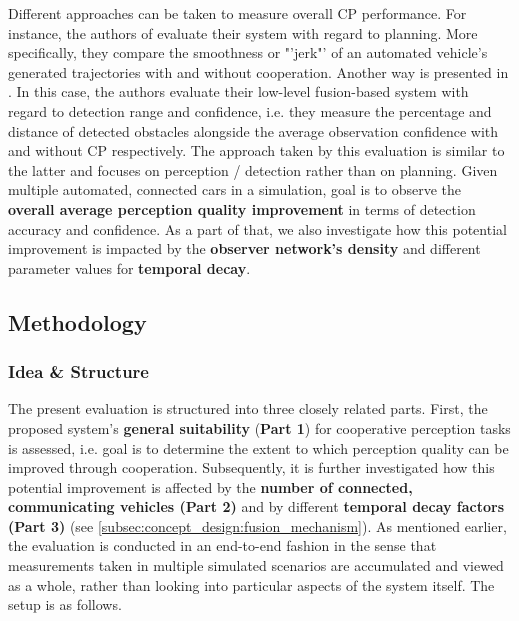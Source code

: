Different approaches can be taken to measure overall CP performance. For instance, the authors of \cite{liu2013motion} evaluate their system with regard to planning. More specifically, they compare the smoothness or "'jerk"' of an automated vehicle's generated trajectories with and without cooperation. Another way is presented in \cite{Chen2019}. In this case, the authors evaluate their low-level fusion-based system with regard to detection range and confidence, i.e. they measure the percentage and distance of detected obstacles alongside the average observation confidence with and without CP respectively. The approach taken by this evaluation is similar to the latter and focuses on perception / detection rather than on planning. Given multiple automated, connected cars in a simulation, goal is to observe the \textbf{overall average perception quality improvement} in terms of detection accuracy and confidence. As a part of that, we also investigate how this potential improvement is impacted by the \textbf{observer network's density} and different parameter values for \textbf{temporal decay}.

\subsection{Methodology}
\label{subsec:evaluation:perception_evaluation:methodology}

\subsubsection{Idea \& Structure}
The present evaluation is structured into three closely related parts. First, the proposed system's \textbf{general suitability} (\textbf{Part 1}) for cooperative perception tasks is assessed, i.e. goal is to determine the extent to which perception quality can be improved through cooperation. Subsequently, it is further investigated how this potential improvement is affected by the \textbf{number of connected, communicating vehicles (Part 2)} and by different \textbf{temporal decay factors (Part 3)} (see \cref{subsec:concept_design:fusion_mechanism}). As mentioned earlier, the evaluation is conducted in an end-to-end fashion in the sense that measurements taken in multiple simulated scenarios are accumulated and viewed as a whole, rather than looking into particular aspects of the system itself. The setup is as follows.
\par
\bigskip

